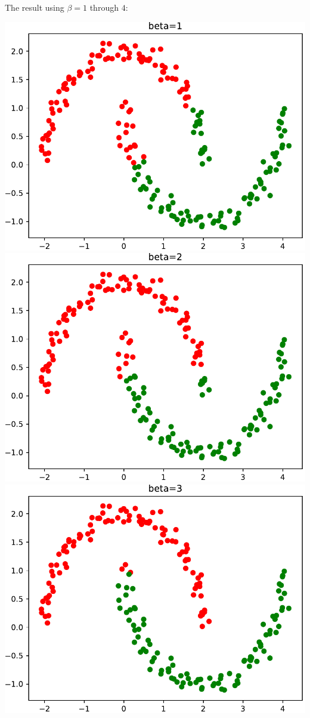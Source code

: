 \documentclass{beamer}
\begin{document}
\begin{frame}
	The result using $\beta = 1$ through $4$:
	\begin{overprint}
		\includegraphics[width=\linewidth]{graphics/task_3_2_spectral1}
		\onslide<2>\includegraphics[width=\linewidth]{graphics/task_3_2_spectral2}
		\onslide<3>\includegraphics[width=\linewidth]{graphics/task_3_2_spectral3}

\end{overprint}
\end{frame}
\end{document}
